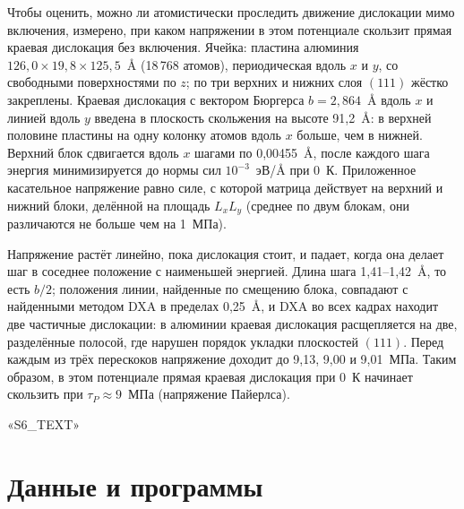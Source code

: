 \documentclass[11pt,a4paper]{article}
\begin{document}
Чтобы оценить, можно ли атомистически проследить движение дислокации мимо
включения, измерено, при каком напряжении в этом потенциале скользит
прямая краевая дислокация без включения. Ячейка: пластина алюминия
$126{,}0\times19{,}8\times125{,}5$~\AA{} (18\,768 атомов), периодическая
вдоль $x$ и $y$, со свободными поверхностями по $z$; по три верхних и нижних
слоя $(111)$ жёстко закреплены. Краевая дислокация с вектором Бюргерса
$b=2{,}864$~\AA{} вдоль $x$ и линией вдоль $y$ введена в плоскость
скольжения на высоте 91{,}2~\AA{}: в верхней половине пластины на одну
колонку атомов вдоль $x$ больше, чем в нижней. Верхний блок сдвигается
вдоль $x$ шагами по 0{,}00455~\AA, после каждого шага энергия минимизируется
до нормы сил $10^{-3}$~эВ/\AA{} при 0~К. Приложенное касательное напряжение
равно силе, с которой матрица действует на верхний и нижний блоки,
делённой на площадь $L_xL_y$ (среднее по двум блокам, они различаются не
больше чем на 1~МПа).

Напряжение растёт линейно, пока дислокация стоит, и падает, когда она
делает шаг в соседнее положение с наименьшей энергией. Длина шага
1{,}41--1{,}42~\AA, то есть $b/2$; положения линии, найденные
по смещению блока, совпадают с найденными методом DXA \cite{Stukowski2012DXA}
в пределах 0{,}25~\AA, и DXA во всех кадрах находит две частичные
дислокации: в алюминии краевая дислокация расщепляется на две, разделённые
полосой, где нарушен порядок укладки плоскостей $(111)$. Перед каждым из трёх перескоков напряжение доходит до 9{,}13,
9{,}00 и 9{,}01~МПа. Таким образом, в этом потенциале прямая краевая
дислокация при 0~К начинает скользить при $\tau_P\approx9$~МПа (напряжение
Пайерлса).

«S6_TEXT»

\section{Данные и программы}
\sloppy
\end{document}
